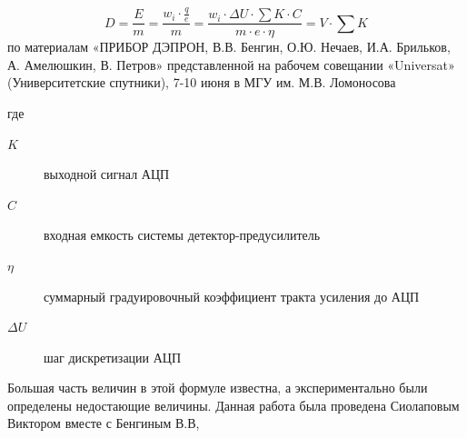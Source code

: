 \begin{equation}\label{eq:benghin_doze_code}
D = \frac{E}{m} = \dfrac{w_i \cdot\frac{q}{e}}{m} = \frac{w_i \cdot \Delta U \cdot\sum K \cdot C}{m \cdot e \cdot \eta}  = V \cdot \sum K
\end{equation}
по материалам  «ПРИБОР ДЭПРОН, В.В. Бенгин, О.Ю. Нечаев, И.А. Брильков, А. Амелюшкин, В. Петров»  представленной на рабочем совещании «Universat» (Университетские спутники), 7-10 июня в МГУ им. М.В. Ломоносова

где \begin{description}	
	\item[$ K $] выходной сигнал АЦП
	\item[$ C $] входная емкость системы детектор-предусилитель
	\item[$ \eta $] суммарный градуировочный коэффициент тракта усиления до АЦП
	\item[$ \Delta U $] шаг дискретизации АЦП
\end{description} 
Большая часть величин в этой формуле известна, а экспериментально были определены недостающие величины. Данная работа была проведена Сиолаповым Виктором вместе с Бенгиным В.В, 
